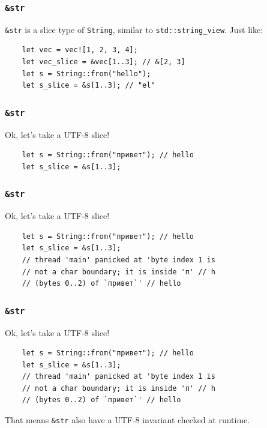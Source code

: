 \documentclass[aspectratio=1610,t]{beamer}
\begin{document}

\begin{frame}[fragile]
\frametitle{\texttt{\&str}}
\texttt{\&str} is a slice type of \texttt{String}, similar to \texttt{std::string\_view}. Just like:

\begin{verbatim}
    let vec = vec![1, 2, 3, 4];
    let vec_slice = &vec[1..3]; // &[2, 3]
    let s = String::from("hello");
    let s_slice = &s[1..3]; // "el"
\end{verbatim}
\end{frame}


\begin{frame}[fragile]
\frametitle{\texttt{\&str}}
Ok, let's take a UTF-8 slice!

\begin{verbatim}
    let s = String::from("привет"); // hello
    let s_slice = &s[1..3];
\end{verbatim}
\end{frame}


\begin{frame}[fragile]
\frametitle{\texttt{\&str}}
Ok, let's take a UTF-8 slice!

\begin{verbatim}
    let s = String::from("привет"); // hello
    let s_slice = &s[1..3];
    // thread 'main' panicked at 'byte index 1 is
    // not a char boundary; it is inside 'п' // h
    // (bytes 0..2) of `привет`' // hello
\end{verbatim}
\end{frame}


\begin{frame}[fragile]
\frametitle{\texttt{\&str}}
Ok, let's take a UTF-8 slice!

\begin{verbatim}
    let s = String::from("привет"); // hello
    let s_slice = &s[1..3];
    // thread 'main' panicked at 'byte index 1 is
    // not a char boundary; it is inside 'п' // h
    // (bytes 0..2) of `привет`' // hello
\end{verbatim}

That means \texttt{\&str} also have a UTF-8 invariant checked at runtime.
\end{frame}
\end{document}
